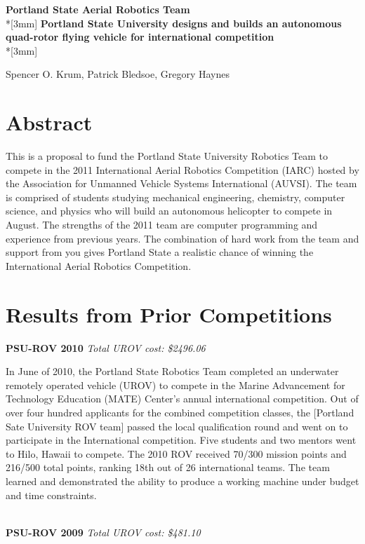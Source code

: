 \documentclass{article}
\begin{document}
\begin{center}
{\Large{\bf Portland State Aerial Robotics Team}}\\*[3mm]
{\bf Portland State University designs and builds an autonomous quad-rotor flying vehicle for international competition} \\*[3mm]

Spencer O. Krum, Patrick Bledsoe, Gregory Haynes

\end{center}


\section{Abstract} This is a  proposal to fund the Portland State University Robotics Team to compete in the 2011 International Aerial Robotics Competition (IARC) hosted by the Association for Unmanned Vehicle Systems International (AUVSI). The team is comprised of students studying mechanical engineering,
 chemistry, computer science, and physics who will build an autonomous helicopter to compete in August.  The strengths of the 2011 team are computer programming and experience from previous years. The combination of hard work 
from the team and support from you gives Portland State a realistic chance of winning the International Aerial Robotics Competition.  


\section{Results from Prior Competitions}

\noindent
{\bf PSU-ROV 2010}
{\it Total UROV cost: \$2496.06}

In June of 2010, the Portland State Robotics Team completed an underwater remotely operated vehicle (UROV) to compete in the Marine Advancement for Technology Education (MATE) Center's annual international competition. Out of over four hundred applicants for the combined competition classes, the [Portland Sate University ROV team] passed the local qualification round and went on to participate in the International competition. 
Five students and two mentors went to Hilo, Hawaii to compete. The 2010 ROV received 70/300 mission points and 216/500 total points, 
ranking 18th out of 26 international teams. The team learned and demonstrated the ability to produce a working machine under budget and time constraints.

\ \\
\noindent
{\bf PSU-ROV 2009}
{\it Total UROV cost: \$481.10}
\end{document}

